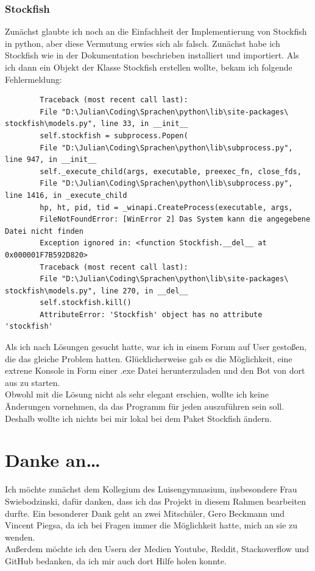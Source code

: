 \documentclass[a4paper, 10pt]{scrartcl}
\begin{document}
\subsubsection{Stockfish}
Zunächst glaubte ich noch an die Einfachheit der Implementierung von Stockfish in
python, aber diese Vermutung erwies sich als falsch. Zunächst habe ich Stockfish wie in
der Dokumentation beschrieben installiert und importiert. Als ich dann ein Objekt der
Klasse \glqq Stockfish\grqq{} erstellen wollte, bekam ich folgende Fehlermeldung:
\begin{lstlisting}
        Traceback (most recent call last):
        File "D:\Julian\Coding\Sprachen\python\lib\site-packages\ stockfish\models.py", line 33, in __init__
        self.stockfish = subprocess.Popen(
        File "D:\Julian\Coding\Sprachen\python\lib\subprocess.py", line 947, in __init__
        self._execute_child(args, executable, preexec_fn, close_fds,
        File "D:\Julian\Coding\Sprachen\python\lib\subprocess.py", line 1416, in _execute_child
        hp, ht, pid, tid = _winapi.CreateProcess(executable, args,
        FileNotFoundError: [WinError 2] Das System kann die angegebene Datei nicht finden
        Exception ignored in: <function Stockfish.__del__ at 0x000001F7B592D820>
        Traceback (most recent call last):
        File "D:\Julian\Coding\Sprachen\python\lib\site-packages\ stockfish\models.py", line 270, in __del__
        self.stockfish.kill()
        AttributeError: 'Stockfish' object has no attribute 'stockfish'
\end{lstlisting}
Als ich nach Lösungen gesucht hatte, war ich in einem Forum auf User gestoßen,
die das gleiche Problem hatten. Glücklicherweise gab es die Möglichkeit, eine extrene Konsole in Form einer .exe Datei
herunterzuladen und den Bot von dort aus zu starten. \\
Obwohl mit die Lösung nicht als sehr elegant erschien, wollte ich keine Änderungen vornehmen, da das Programm für jeden
auszuführen sein soll. Deshalb wollte ich nichts bei mir lokal bei dem Paket \glqq Stockfish\grqq{} ändern. 

\section{Danke an\dots{}}
Ich möchte zunächst dem  Kollegium des Luisengymnasium, insbesondere Frau
Swiebodzinski, dafür danken, dass ich das Projekt in diesem Rahmen bearbeiten durfte. 
Ein besonderer Dank geht an zwei Mitschüler, Gero Beckmann und Vincent Piegsa, da ich
bei Fragen immer die Möglichkeit hatte, mich an sie zu wenden.\\
Außerdem möchte ich den Usern der Medien Youtube, Reddit, Stackoverflow und GitHub bedanken,
da ich mir auch dort Hilfe holen konnte. 
\pagebreak
\end{document}
